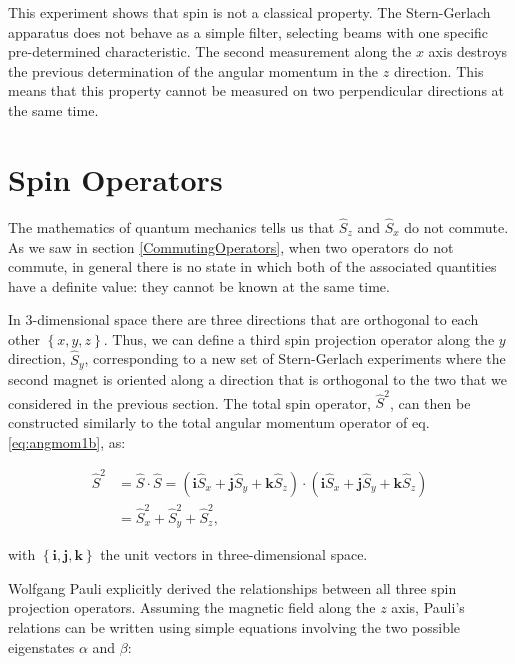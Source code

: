 \documentclass[
  english,
  9pt,
]{extbook}
\theoremstyle{definition}
\theoremstyle{definition}
\theoremstyle{definition}
\theoremstyle{definition}
\theoremstyle{remark}
\begin{document}
This experiment shows that spin is not a classical property. The Stern-Gerlach apparatus does not behave as a simple filter, selecting beams with one specific pre-determined characteristic. The second measurement along the \(x\) axis destroys the previous determination of the angular momentum in the \(z\) direction. This means that this property cannot be measured on two perpendicular directions at the same time.

\section{Spin Operators}\label{spin-operators}

The mathematics of quantum mechanics tells us that \(\hat{S}_z\) and \(\hat{S}_x\) do not commute. As we saw in section \ref{CommutingOperators}, when two operators do not commute, in general there is no state in which both of the associated quantities have a definite value: they cannot be known at the same time.

In 3-dimensional space there are three directions that are orthogonal to each other \(\left\{x,y,z\right\}\). Thus, we can define a third spin projection operator along the \(y\) direction, \(\hat{S}_y\), corresponding to a new set of Stern-Gerlach experiments where the second magnet is oriented along a direction that is orthogonal to the two that we considered in the previous section. The total spin operator, \(\hat{S}^2\), can then be constructed similarly to the total angular momentum operator of eq. \eqref{eq:angmom1b}, as:

\begin{equation}
\begin{aligned}
\hat{S}^2 &=\hat{S}\cdot\hat{S}=\left(\mathbf{i}\hat{S}_x+\mathbf{j}\hat{S}_y+\mathbf{k}\hat{S}_z\right)\cdot\left(\mathbf{i}\hat{S}_x+\mathbf{j}\hat{S}_y+\mathbf{k}\hat{S}_z \right) \\
&=\hat{S}_x^2+\hat{S}_y^2+\hat{S}_z^2,
\end{aligned}
\label{eq:spop1}    
\end{equation}

with \(\left\{\mathbf{i},\mathbf{j},\mathbf{k}\right\}\) the unit vectors in three-dimensional space.

Wolfgang Pauli explicitly derived the relationships between all three spin projection operators. Assuming the magnetic field along the \(z\) axis, Pauli's relations can be written using simple equations involving the two possible eigenstates \(\alpha\) and \(\beta\):
\end{document}
